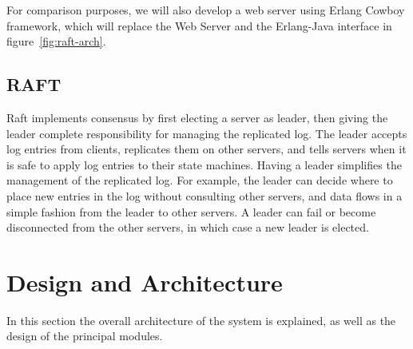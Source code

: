 \documentclass[a4paper]{article}
\begin{document}
For comparison purposes, we will also develop a web server using Erlang Cowboy
framework, which will replace the Web Server and the Erlang-Java interface in 
figure~\ref{fig:raft-arch}.

\subsection{RAFT} 
Raft implements consensus by first electing a server as leader, then giving the leader complete
responsibility for managing the replicated log. The leader accepts log entries from clients, replicates
them on other servers, and tells servers when it is safe to apply log entries to their state machines.
Having a leader simplifies the management of the replicated log. For example, the leader can decide
where to place new entries in the log without consulting other servers, and data flows in a simple
fashion from the leader to other servers. A leader can fail or become disconnected from the other
servers, in which case a new leader is elected.


\section{Design and Architecture}
In this section the overall architecture of the system is explained, as well
as the design of the principal modules.
\end{document}

